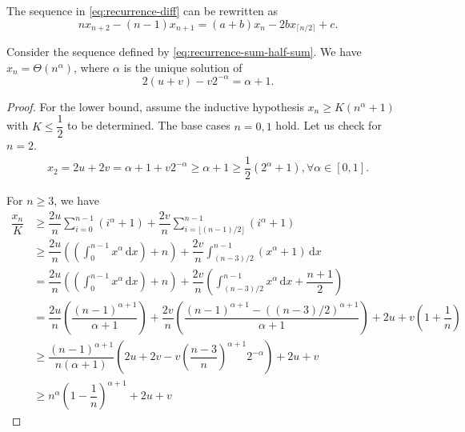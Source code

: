 \begin{lemma}
  The sequence in \eqref{eq:recurrence-diff} can be rewritten as
  \begin{equation}
    nx_{n+2} - (n-1)x_{n+1} = (a+b)x_n - 2b x_{\lceil n/2\rceil} + c.
  \end{equation}
\end{lemma}

\begin{proposition}
  Consider the sequence defined by \eqref{eq:recurrence-sum-half-sum}. We have $x_n = \Theta(n^{\alpha})$, where $\alpha$ is the unique solution of
  $$2(u+v) - v2^{-\alpha} = \alpha+1.$$
\end{proposition}

\begin{proof}
  For the lower bound, assume the inductive hypothesis $x_n \ge K(n^{\alpha}+1)$ with $K\le \dfrac{1}{2}$ to be determined. The base cases $n=0,1$ hold. Let us check for $n=2$.
  \begin{align*}
    x_2 = 2u + 2v = \alpha+1+v2^{-\alpha} \ge \alpha+1 \ge \dfrac{1}{2}(2^{\alpha}+1), \forall \alpha \in [0,1].
  \end{align*}

  For $n\ge 3$, we have
  \begin{align*}
    \dfrac{x_{n}}{K}
     & \ge \dfrac{2u}{n}\sum_{i=0}^{n-1}(i^{\alpha}+1) + \dfrac{2v}{n}\sum_{i=\lfloor (n-1)/2 \rfloor}^{n-1}(i^{\alpha}+1)                                                                       \\
     & \ge \dfrac{2u}{n}\left(\left(\int_{0}^{n-1}x^{\alpha}\,\mathrm{d}x\right)+n\right)  + \dfrac{2v}{n}\int_{(n-3)/2}^{n-1}(x^{\alpha}+1) \,\mathrm{d}x                                       \\
     & = \dfrac{2u}{n}\left(\left(\int_{0}^{n-1}x^{\alpha}\,\mathrm{d}x\right)+n\right)  + \dfrac{2v}{n}\left(\int_{(n-3)/2}^{n-1}x^{\alpha} \,\mathrm{d}x +\dfrac{n+1}{2}\right)                \\
     & = \dfrac{2u}{n}\left(\dfrac{(n-1)^{\alpha+1}}{\alpha+1} \right) + \dfrac{2v}{n}\left(\dfrac{(n-1)^{\alpha+1} - ((n-3)/2)^{\alpha+1}}{\alpha+1}\right) + 2u + v\left(1+\dfrac{1}{n}\right) \\
     & \ge \dfrac{(n-1)^{\alpha+1}}{n(\alpha+1)}\left(2u+2v - v\left(\dfrac{n-3}{n}\right)^{\alpha+1}2^{-\alpha}\right)+ 2u + v                                                                  \\
     & \ge n^{\alpha}\left(1-\dfrac{1}{n}\right)^{\alpha+1} + 2u+v
  \end{align*}


\end{proof}
